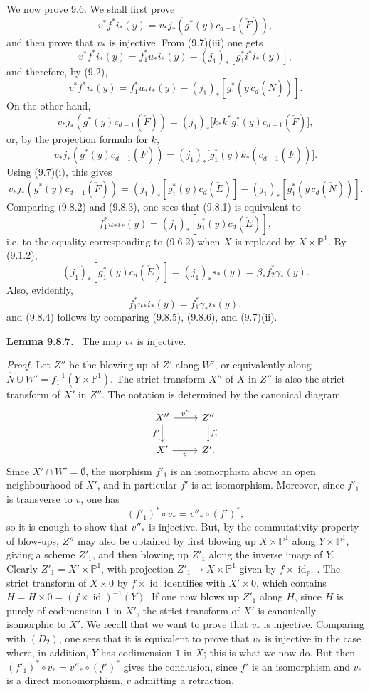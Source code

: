 \documentclass[11pt]{article}
\newenvironment{statement}[1]{\par\medskip\noindent\textbf{#1.}\ }{\par\medskip}
\begin{document}
We now prove 9.6. We shall first prove
\[
v^*f^*i_*(y)=v_*j_*(g^*(y)c_{d-1}(\check F)),
\tag{9.8.1}
\]
and then prove that $v_*$ is injective. From (9.7)(iii) one gets
\[
v^*f^*i_*(y)=f_1^*u_*i_*(y)-(j_1)_*[g_1^*i^*i_*(y)],
\]
and therefore, by (9.2),
\[
v^*f^*i_*(y)=f_1^*u_*i_*(y)-(j_1)_*[g_1^*(y\,c_d(\check N))].
\tag{9.8.2}
\]
On the other hand,
\[
v_*j_*(g^*(y)c_{d-1}(\check F))
=(j_1)_*\bigl[k_*k^*g_1^*(y)c_{d-1}(\check F)\bigr],
\]
or, by the projection formula for $k$,
\[
v_*j_*(g^*(y)c_{d-1}(\check F))
=(j_1)_*\bigl[g_1^*(y)k_*(c_{d-1}(\check F))\bigr].
\]
Using (9.7)(i), this gives
\[
v_*j_*(g^*(y)c_{d-1}(\check F))
=(j_1)_*[g_1^*(y)c_d(\check E)]-(j_1)_*[g_1^*(y\,c_d(\check N))].
\tag{9.8.3}
\]
Comparing (9.8.2) and (9.8.3), one sees that (9.8.1) is equivalent to
\[
f_1^*u_*i_*(y)=(j_1)_*[g_1^*(y)c_d(\check E)],
\tag{9.8.4}
\]
i.e. to the equality corresponding to (9.6.2) when $X$ is replaced by $X\times\mathbb P^1$. By (9.1.2),
\[
(j_1)_*[g_1^*(y)c_d(\check E)]=(j_1)_*s_*(y)=\beta_*f_2^*\gamma_*(y).
\tag{9.8.5}
\]
Also, evidently,
\[
f_1^*u_*i_*(y)=f_1^*\gamma_*i_*(y),
\tag{9.8.6}
\]
and (9.8.4) follows by comparing (9.8.5), (9.8.6), and (9.7)(ii).

\begin{statement}{Lemma 9.8.7}
The map $v_*$ is injective.
\end{statement}

\emph{Proof.} Let $Z''$ be the blowing-up of $Z'$ along $W'$, or equivalently along $\widehat N\cup W'=f_1^{-1}(Y\times\mathbb P^1)$. The strict transform $X''$ of $X$ in $Z''$ is also the strict transform of $X'$ in $Z''$. The notation is determined by the canonical diagram
\[
\begin{tikzcd}
X''\arrow[r,"v''"]\arrow[d,"f'"']&Z''\arrow[d,"f'_1"]\\
X'\arrow[r,"v"']&Z'.
\end{tikzcd}
\]
Since $X'\cap W'=\emptyset$, the morphism $f'_1$ is an isomorphism above an open neighbourhood of $X'$, and in particular $f'$ is an isomorphism. Moreover, since $f'_1$ is transverse to $v$, one has
\[
(f'_1)^*\circ v_*=v''_*\circ(f')^*,
\tag{9.8.8}
\]
so it is enough to show that $v''_*$ is injective. But, by the commutativity property of blow-ups, $Z''$ may also be obtained by first blowing up $X\times\mathbb P^1$ along $Y\times\mathbb P^1$, giving a scheme $Z'_1$, and then blowing up $Z'_1$ along the inverse image of $Y$. Clearly $Z'_1=X'\times\mathbb P^1$, with projection $Z'_1\to X\times\mathbb P^1$ given by $f\times\operatorname{id}_{\mathbb P^1}$. The strict transform of $X\times0$ by $f\times\operatorname{id}$ identifies with $X'\times0$, which contains $H=H\times0=(f\times\operatorname{id})^{-1}(Y)$. If one now blows up $Z'_1$ along $H$, since $H$ is purely of codimension $1$ in $X'$, the strict transform of $X'$ is canonically isomorphic to $X'$. We recall that we want to prove that $v_*$ is injective. Comparing with $(D_2)$, one sees that it is equivalent to prove that $v_*$ is injective in the case where, in addition, $Y$ has codimension $1$ in $X$; this is what we now do. But then $(f'_1)^*\circ v_*=v''_*\circ(f')^*$ gives the conclusion, since $f'$ is an isomorphism and $v_*$ is a direct monomorphism, $v$ admitting a retraction.
\end{document}
